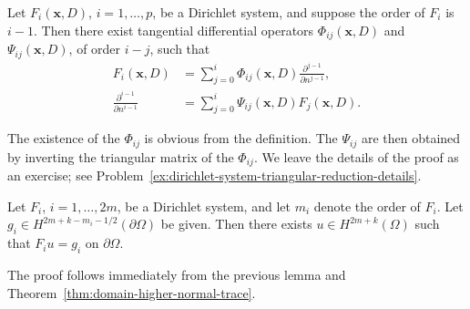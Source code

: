 \begin{Lemma}
\label{lem:dirichlet-system-tangential-triangular-reduction}
Let $F_i(\bm{x},D)$, $i=1,\ldots,p$, be a Dirichlet system, and suppose the order of $F_i$ is $i-1$. Then there exist tangential differential operators $\Phi_{ij}(\bm{x},D)$ and $\Psi_{ij}(\bm{x},D)$, of order $i-j$, such that
\begin{equation}\label{eq:dirichlet-system-tangential-triangular-reduction}
\begin{aligned}
F_i(\bm{x},D)&=\sum_{j=0}^i\Phi_{ij}(\bm{x},D)\frac{\partial^{j-1}}{\partial n^{j-1}},\\
\frac{\partial^{i-1}}{\partial n^{i-1}}&=\sum_{j=0}^i\Psi_{ij}(\bm{x},D)F_j(\bm{x},D).
\end{aligned}
\end{equation}

\end{Lemma}

The existence of the $\Phi_{ij}$ is obvious from the definition. The $\Psi_{ij}$ are then obtained by inverting the triangular matrix of the $\Phi_{ij}$. We leave the details of the proof as an exercise; see Problem~\ref{ex:dirichlet-system-triangular-reduction-details}.

\begin{Corollary}
\label{cor:dirichlet-system-prescribed-traces}
Let $F_i$, $i=1,\ldots,2m$, be a Dirichlet system, and let $m_i$ denote the order of $F_i$. Let $g_i\in H^{2m+k-m_i-1/2}(\partial\Omega)$ be given. Then there exists $u\in H^{2m+k}(\Omega)$ such that $F_iu=g_i$ on $\partial\Omega$.
\end{Corollary}

The proof follows immediately from the previous lemma and Theorem~\ref{thm:domain-higher-normal-trace}.
